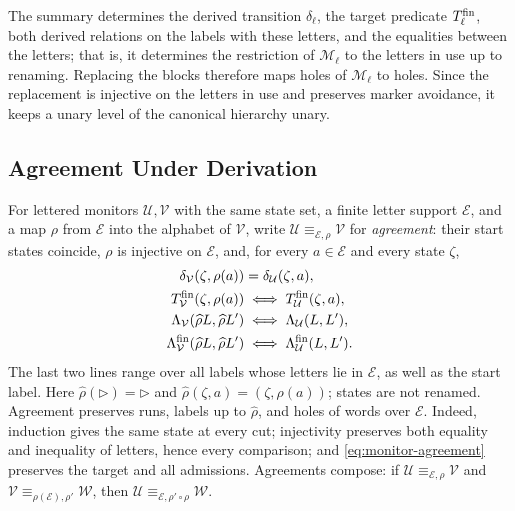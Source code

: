 The summary determines the derived transition $\delta_\ell$, the target predicate
$T^{\mathrm{fin}}_\ell$, both derived relations on the labels with these letters, and the equalities
between the letters; that is, it determines the restriction of $\mathcal{M}_\ell$ to the letters
in use up to renaming. Replacing the blocks
therefore maps holes of $\mathcal{M}_\ell$ to holes. Since the replacement is injective on the
letters in use and preserves marker avoidance, it keeps a unary level of the canonical
hierarchy unary.


\subsection{Agreement Under Derivation}
For lettered monitors $\mathcal U,\mathcal V$ with the same state set,
a finite letter support $\mathcal E$, and a map $\rho$ from $\mathcal E$ into the alphabet
of $\mathcal V$, write $\mathcal U\equiv_{\mathcal E,\rho}\mathcal V$ for
\emph{agreement}: their start states coincide, $\rho$ is injective on
$\mathcal E$, and, for every $a\in \mathcal E$ and every state $\zeta$,
\begin{equation}\label{eq:monitor-agreement}
\begin{aligned}
\delta_{\mathcal V}(\zeta,\rho(a))&=\delta_{\mathcal U}(\zeta,a),\\
T^{\mathrm{fin}}_{\mathcal V}(\zeta,\rho(a))&\iff T^{\mathrm{fin}}_{\mathcal U}(\zeta,a),\\
\Lambda_{\mathcal V}(\widehat\rho L,\widehat\rho L')&\iff
  \Lambda_{\mathcal U}(L,L'),\\
\Lambda^{\mathrm{fin}}_{\mathcal V}(\widehat\rho L,\widehat\rho L')&\iff
  \Lambda^{\mathrm{fin}}_{\mathcal U}(L,L').
\end{aligned}
\end{equation}
The last two lines range over all labels whose letters lie in $\mathcal E$, as
well as the start label. Here $\widehat\rho(\triangleright)=\triangleright$
and $\widehat\rho(\zeta,a)=(\zeta,\rho(a))$; states are not renamed.
Agreement preserves runs, labels up to $\widehat\rho$, and holes of words
over $\mathcal E$. Indeed, induction gives the same state at every cut; injectivity
preserves both equality and inequality of letters, hence every comparison;
and \eqref{eq:monitor-agreement} preserves the target and all admissions.
Agreements compose: if $\mathcal U\equiv_{\mathcal E,\rho}\mathcal V$ and
$\mathcal V\equiv_{\rho(\mathcal E),\rho'}\mathcal W$, then
$\mathcal U\equiv_{\mathcal E,\rho'\circ\rho}\mathcal W$.

